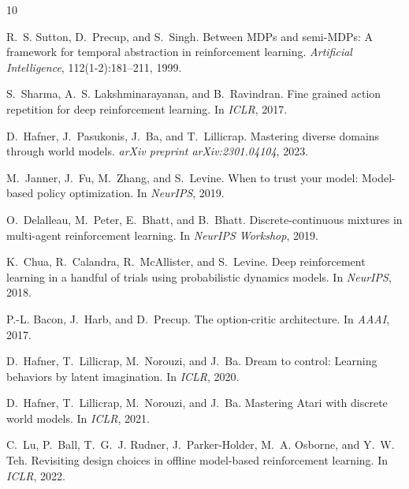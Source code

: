 \documentclass[10pt,letterpaper]{article}
\begin{document}


\begin{thebibliography}{10}

R.~S. Sutton, D.~Precup, and S.~Singh.
\newblock Between {MDPs} and semi-{MDPs}: A framework for temporal abstraction in reinforcement learning.
\newblock \emph{Artificial Intelligence}, 112(1-2):181--211, 1999.

S.~Sharma, A.~S. Lakshminarayanan, and B.~Ravindran.
\newblock Fine grained action repetition for deep reinforcement learning.
\newblock In \emph{ICLR}, 2017.

D.~Hafner, J.~Pasukonis, J.~Ba, and T.~Lillicrap.
\newblock Mastering diverse domains through world models.
\newblock \emph{arXiv preprint arXiv:2301.04104}, 2023.

M.~Janner, J.~Fu, M.~Zhang, and S.~Levine.
\newblock When to trust your model: Model-based policy optimization.
\newblock In \emph{NeurIPS}, 2019.

O.~Delalleau, M.~Peter, E.~Bhatt, and B.~Bhatt.
\newblock Discrete-continuous mixtures in multi-agent reinforcement learning.
\newblock In \emph{NeurIPS Workshop}, 2019.

K.~Chua, R.~Calandra, R.~McAllister, and S.~Levine.
\newblock Deep reinforcement learning in a handful of trials using probabilistic dynamics models.
\newblock In \emph{NeurIPS}, 2018.

P.-L. Bacon, J.~Harb, and D.~Precup.
\newblock The option-critic architecture.
\newblock In \emph{AAAI}, 2017.

D.~Hafner, T.~Lillicrap, M.~Norouzi, and J.~Ba.
\newblock Dream to control: Learning behaviors by latent imagination.
\newblock In \emph{ICLR}, 2020.

D.~Hafner, T.~Lillicrap, M.~Norouzi, and J.~Ba.
\newblock Mastering {A}tari with discrete world models.
\newblock In \emph{ICLR}, 2021.

C.~Lu, P.~Ball, T.~G.~J. Rudner, J.~Parker-Holder, M.~A. Osborne, and Y.~W. Teh.
\newblock Revisiting design choices in offline model-based reinforcement learning.
\newblock In \emph{ICLR}, 2022.

\end{thebibliography}
\end{document}
